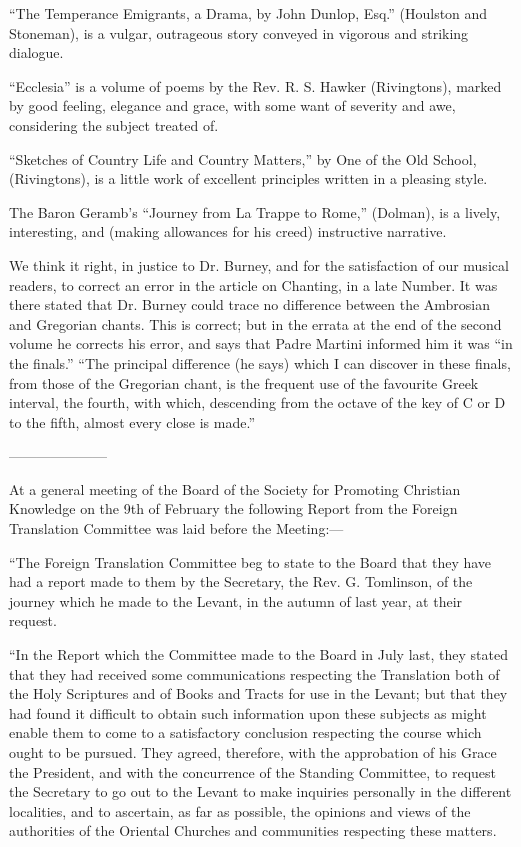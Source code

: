 ``The Temperance Emigrants, a Drama, by John Dunlop,
Esq.'' (Houlston and Stoneman), is a vulgar, outrageous story conveyed in
vigorous and striking dialogue.

``Ecclesia'' is a volume of poems by the Rev. R. S.
Hawker (Rivingtons), marked by good feeling, elegance and grace, with
some want of severity and awe, considering the subject treated of.

``Sketches of Country Life and Country Matters,'' by
One of the Old School, (Rivingtons), is a little work of excellent
principles written in a pleasing style.

The Baron Geramb's ``Journey from La Trappe to Rome,''
(Dolman), is a lively, interesting, and (making allowances for his
creed) instructive narrative.

We think it right, in justice to Dr. Burney, and
for the satisfaction of our musical readers, to correct an error in the
article on Chanting, in a late Number. It was there stated that Dr.
Burney could trace no difference between the Ambrosian and
Gregorian chants. This is correct; but in the errata at the end of the
second volume he corrects his error, and says that Padre Martini
informed him it was ``in the finals.'' ``The principal difference (he says)
which I can discover in these finals, from those of the Gregorian chant,
is the frequent use of the favourite Greek interval, the fourth, with
which, descending from the octave of the key of C or D to the fifth,
almost every close is made.''

———————

At a general meeting of the Board of the Society
for Promoting Christian Knowledge on the 9th of February the following
Report from the Foreign Translation Committee was laid before the
Meeting:—

``The Foreign Translation Committee beg to state to
the Board that they have had a report made to them by the Secretary, the
Rev. G. Tomlinson, of the journey which he made to the Levant, in the
autumn of last year, at their request.

``In the Report which the Committee made to the
Board in July last, they stated that they had received some
communications respecting the Translation both of the Holy Scriptures
and of Books and Tracts for use in the Levant; but that they had found
it difficult to obtain such information upon these subjects as might
enable them to come to a satisfactory conclusion respecting the course
which ought to be pursued. They agreed, therefore, with the approbation
of his Grace the President, and with the concurrence of the Standing
Committee, to request the Secretary to go out to the Levant to make
inquiries personally in the different localities, and to ascertain, as
far as possible, the opinions and views of the authorities of the
Oriental Churches and communities respecting these matters.

